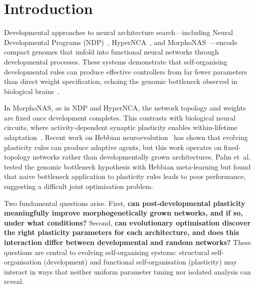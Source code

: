 \documentclass[sigconf,nonacm]{acmart}
\begin{document}

\maketitle

\section{Introduction}
\label{sec:intro}

Developmental approaches to neural architecture search---including Neural Developmental Programs (NDP)~\cite{najarro2023ndp}, HyperNCA~\cite{najarro2022hypernca}, and MorphoNAS~\cite{glybovets2026morphonas}---encode compact genomes that unfold into functional neural networks through developmental processes. These systems demonstrate that self-organising developmental rules can produce effective controllers from far fewer parameters than direct weight specification, echoing the genomic bottleneck observed in biological brains~\cite{zador2019critique}.

In MorphoNAS, as in NDP and HyperNCA, the network topology and weights are fixed once development completes. This contrasts with biological neural circuits, where activity-dependent synaptic plasticity enables within-lifetime adaptation~\cite{hebb1949organization}. Recent work on Hebbian neuroevolution~\cite{najarro2020meta} has shown that evolving plasticity rules can produce adaptive agents, but this work operates on fixed-topology networks rather than developmentally grown architectures. Palm et~al.~\cite{palm2021testing} tested the genomic bottleneck hypothesis with Hebbian meta-learning but found that naive bottleneck application to plasticity rules leads to poor performance, suggesting a difficult joint optimisation problem.

Two fundamental questions arise. First, \textbf{can post-development\-al plasticity meaningfully improve morphogenetically grown networks, and if so, under what conditions?} Second, \textbf{can evolutionary optimisation discover the right plasticity parameters for each architecture, and does this interaction differ between developmental and random networks?} These questions are central to evolving self-organising systems: structural self-organisation (development) and functional self-organisation (plasticity) may interact in ways that neither uniform parameter tuning nor isolated analysis can reveal.
\end{document}
